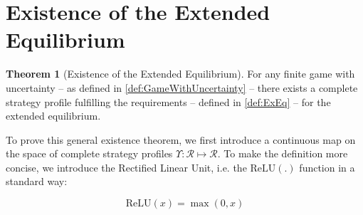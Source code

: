 \documentclass{article}
\theoremstyle{definition}
\newtheorem{theorem}{Theorem}[section]
\begin{document}
\section{Existence of the Extended Equilibrium}

\begin{theorem}[Existence of the Extended Equilibrium]
\label{thm:ExExEq}
    For any finite game with uncertainty -- as defined in \autoref{def:GameWithUncertainty} -- there exists a complete strategy profile fulfilling the requirements -- defined in \autoref{def:ExEq} -- for the extended equilibrium.
    
\end{theorem}

To prove this general existence theorem, we first introduce a continuous map on the space of complete strategy profiles $\Upsilon : \mathcal{R} \mapsto \mathcal{R}$. To make the definition more concise, we introduce the Rectified Linear Unit, i.e. the $\mathrm{ReLU}(.)$ function \cite{paper:HintonReLU2010,paper:Fukushima1975,paper:Householder1941} in a standard way:

\begin{equation}
\label{eqdef:ReLU}
    \mathrm{ReLU}(x) = \max(0,x)
\end{equation}
\end{document}
